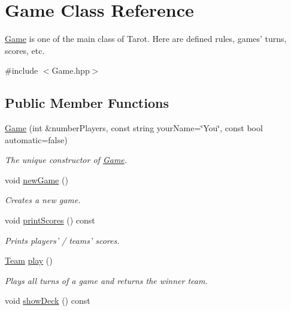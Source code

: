 \hypertarget{classGame}{\section{\-Game \-Class \-Reference}
\label{classGame}
}


\hyperlink{classGame}{\-Game} is one of the main class of \-Tarot. \-Here are defined rules, games' turns, scores, etc.  




{\ttfamily \#include $<$\-Game.\-hpp$>$}

\subsection*{\-Public \-Member \-Functions}
\begin{DoxyCompactItemize}
\item 
\hyperlink{classGame_a584bfe348c8e1128dbb4b1fb40a05f0b}{\-Game} (int \&number\-Players, const string your\-Name=\char`\"{}\-You\char`\"{}, const bool automatic=false)
\begin{DoxyCompactList}\small\item\em \-The unique constructor of \hyperlink{classGame}{\-Game}. \end{DoxyCompactList}\item 
\hypertarget{classGame_a12f32ba70a35a0dcd1f527b4d4a0d2c4}{void \hyperlink{classGame_a12f32ba70a35a0dcd1f527b4d4a0d2c4}{new\-Game} ()}\label{classGame_a12f32ba70a35a0dcd1f527b4d4a0d2c4}

\begin{DoxyCompactList}\small\item\em \-Creates a new game. \end{DoxyCompactList}\item 
\hypertarget{classGame_acb39f55a7b0b1d0d35b06d305a508dd4}{void \hyperlink{classGame_acb39f55a7b0b1d0d35b06d305a508dd4}{print\-Scores} () const }\label{classGame_acb39f55a7b0b1d0d35b06d305a508dd4}

\begin{DoxyCompactList}\small\item\em \-Prints players' / teams' scores. \end{DoxyCompactList}\item 
\hypertarget{classGame_a6a76e181e24425eb361960d5b5d184bd}{\hyperlink{classTeam}{\-Team} \hyperlink{classGame_a6a76e181e24425eb361960d5b5d184bd}{play} ()}\label{classGame_a6a76e181e24425eb361960d5b5d184bd}

\begin{DoxyCompactList}\small\item\em \-Plays all turns of a game and returns the winner team. \end{DoxyCompactList}\item 
\hypertarget{classGame_a1e9e48c10a9ca4bc66b69e05b983e3ab}{void \hyperlink{classGame_a1e9e48c10a9ca4bc66b69e05b983e3ab}{show\-Deck} () const }\label{classGame_a1e9e48c10a9ca4bc66b69e05b983e3ab}


\end{DoxyCompactItemize}
